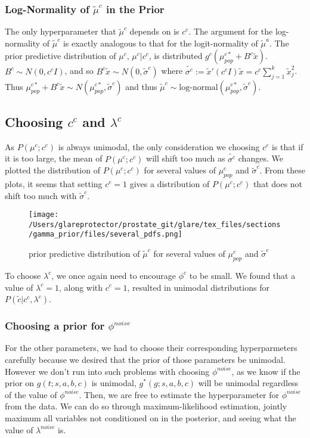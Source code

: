 \subsubsection{Log-Normality of $\tilde{\mu}^c$ in the Prior}

The only hyperparameter that $\tilde{\mu}^c$ depends on is $c^c$.  The argument for the log-normality of $\tilde{\mu}^c$ is exactly analogous to that for the logit-normality of $\tilde{\mu}^a$.  The prior predictive distribution of $\mu^c$, $\mu^c|c^c$, is distributed $g^c(\mu_{pop}^{c*} + B^c\tilde{x})$.  $B^c \sim N(0, c^cI)$, and so $B^c\tilde{x} \sim N(0, \tilde{\sigma}^c)$ where $\tilde{\sigma^c} := \tilde{x}'(c^cI)\tilde{x} = c^c\sum_{j=1}^k \tilde{x}_j^2$.  Thus $\mu_{pop}^{c*} + B^c\tilde{x} \sim N(\mu_{pop}^{c*}, \tilde{\sigma}^c)$ and thus $\tilde{\mu}^c \sim \textrm{log-normal}(\mu_{pop}^{c*}, \tilde{\sigma}^c)$.

\subsection{Choosing $c^c$ and $\lambda^c$}

As $P(\mu^c;c^c)$ is always unimodal, the only consideration we choosing $c^c$ is that if it is too large, the mean of $P(\mu^c;c^c)$ will shift too much as $\tilde{\sigma^c}$ changes.  We plotted the distribution of $P(\mu^c;c^c)$ for several values of $\mu_{pop}^c$ and $\tilde{\sigma}^c$.  From these plots, it seems that setting $c^c=1$ gives a distribution of $P(\mu^c;c^c)$ that does not shift too much with $\tilde{\sigma}^c$.

\begin{figure}
\begin{center}
\texttt{[image: /Users/glareprotector/prostate\_git/glare/tex\_files/sections/gamma\_prior/files/several\_pdfs.png]}
\caption{prior predictive distribution of $\tilde{\mu}^c$ for several values of $\mu_{pop}^c$ and $\tilde{\sigma}^c$}
\end{center}
\end{figure}

To choose $\lambda^c$, we once again need to encourage $\phi^c$ to be small.  We found that a value of $\lambda^c=1$, along with $c^c=1$, resulted in unimodal distributions for $P(\tilde{c}|c^c,\lambda^c)$.

\subsubsection{Choosing a prior for $\phi^{noise}$}
For the other parameters, we had to choose their corresponding hyperparmeters carefully because we desired that the prior of those parameters be unimodal.  However we don't run into such problems with choosing $\phi^{noise}$, as we know if the prior on $g(t;s,a,b,c)$ is unimodal, $g^*(g;s,a,b,c)$ will be unimodal regardless of the value of $\phi^{noise}$.  Then, we are free to estimate the hyperparameter for $\phi^{noise}$ from the data.  We can do so through maximum-likelihood estimation, jointly maximum all variables not conditioned on in the posterior, and seeing what the value of $\lambda^{noise}$ is.

